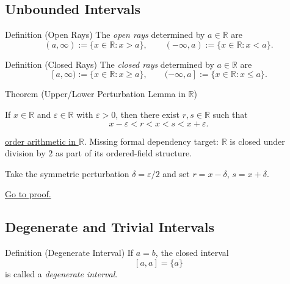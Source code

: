 \subsection*{Unbounded Intervals}

\begin{definitionbox}{Definition (Open Rays)}
The \emph{open rays} determined by $a \in \mathbb{R}$ are
\[
(a,\infty) := \{ x \in \mathbb{R} : x > a \},
\qquad
(-\infty,a) := \{ x \in \mathbb{R} : x < a \}.
\]
\end{definitionbox}

\begin{definitionbox}{Definition (Closed Rays)}
The \emph{closed rays} determined by $a \in \mathbb{R}$ are
\[
[a,\infty) := \{ x \in \mathbb{R} : x \ge a \},
\qquad
(-\infty,a] := \{ x \in \mathbb{R} : x \le a \}.
\]
\end{definitionbox}

\begin{theorembox}{Theorem (Upper/Lower Perturbation Lemma in $\mathbb{R}$)}
\begin{theorem}
\label{thm:real-upper-lower-perturbation}
If $x\in\mathbb{R}$ and $\varepsilon\in\mathbb{R}$ with $\varepsilon>0$, then
there exist $r,s\in\mathbb{R}$ such that
\[
x-\varepsilon<r<x<s<x+\varepsilon.
\]
\end{theorem}
\end{theorembox}

\begin{dependencies}
\hyperref[prop:order-arithmetic]{order arithmetic in $\mathbb{R}$}.
Missing formal dependency target: $\mathbb{R}$ is closed under division by $2$
as part of its ordered-field structure.
\end{dependencies}

\begin{remark*}
Take the symmetric perturbation $\delta=\varepsilon/2$ and set
$r=x-\delta$, $s=x+\delta$.
\end{remark*}

\begin{remark*}[Proof]
\hyperref[prf:real-upper-lower-perturbation]{Go to proof.}
\end{remark*}

\subsection*{Degenerate and Trivial Intervals}

\begin{definitionbox}{Definition (Degenerate Interval)}
If $a=b$, the closed interval
\[
[a,a] = \{a\}
\]
is called a \emph{degenerate interval}.
\end{definitionbox}

